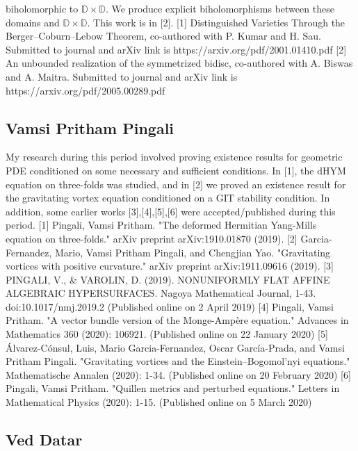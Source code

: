biholomorphic to $\mathbb D \times \mathbb D$. We produce explicit biholomorphisms between these domains and $\mathbb D \times \mathbb D$. This work is in [2].  [1]  Distinguished Varieties Through the Berger--Coburn--Lebow Theorem,  co-authored with P. Kumar and H. Sau. Submitted to journal and arXiv link is https://arxiv.org/pdf/2001.01410.pdf   [2] An unbounded realization of the symmetrized bidisc, co-authored with A. Biswas and A. Maitra. Submitted to journal and arXiv link is  https://arxiv.org/pdf/2005.00289.pdf 


\subsection{Vamsi Pritham Pingali}

My research during this period involved proving existence results for geometric PDE conditioned on some necessary and sufficient conditions. In [1], the dHYM equation on three-folds was studied, and in [2] we proved an existence result for the gravitating vortex equation conditioned on a GIT stability condition. In addition, some earlier works [3],[4],[5],[6] were accepted/published during this period.  [1] Pingali, Vamsi Pritham. "The deformed Hermitian Yang-Mills equation on three-folds." arXiv preprint arXiv:1910.01870 (2019). [2] Garcia-Fernandez, Mario, Vamsi Pritham Pingali, and Chengjian Yao. "Gravitating vortices with positive curvature." arXiv preprint arXiv:1911.09616 (2019). [3] PINGALI, V., & VAROLIN, D. (2019). NONUNIFORMLY FLAT AFFINE ALGEBRAIC HYPERSURFACES. Nagoya Mathematical Journal, 1-43. doi:10.1017/nmj.2019.2 (Published online on 2 April  2019) [4] Pingali, Vamsi Pritham. "A vector bundle version of the Monge-Ampère equation." Advances in Mathematics 360 (2020): 106921. (Published online on 22 January 2020) [5] Álvarez-Cónsul, Luis, Mario Garcia-Fernandez, Oscar García-Prada, and Vamsi Pritham Pingali. "Gravitating vortices and the Einstein–Bogomol’nyi equations." Mathematische Annalen (2020): 1-34. (Published online on 20 February 2020) [6] Pingali, Vamsi Pritham. "Quillen metrics and perturbed equations." Letters in Mathematical Physics (2020): 1-15. (Published online on 5 March 2020) 


\subsection{Ved Datar}

